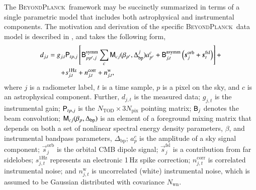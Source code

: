 \documentclass[twocolumn]{aa}
\newcommand{\s}[0]{\vec{s}}
\newcommand{\B}[0]{\tens{B}}
\newcommand{\M}[0]{\tens{M}}
\renewcommand{\P}[0]{\tens{P}}
\newcommand{\Dbp}[0]{\Delta_{\mathrm{bp}}}
\newcommand{\BP}{\textsc{BeyondPlanck}}
\begin{document}
The \BP\ framework may be succinctly summarized in terms of a single
parametric model that includes both astrophysical and instrumental
components. The motivation and derivation of the specific \BP\ data
model is described in \citet{bp01}, and takes the following form,
\begin{equation}
  \begin{split}
    d_{j,t} = g_{j,t}&\P_{tp,j}\left[\B^{\mathrm{symm}}_{pp',j}\sum_{c}
      \M_{cj}(\beta_{p'}, \Dbp^{j})a^c_{p'}  + \B^{\mathrm{asymm}}_{j,t}\left(\s^{\mathrm{orb}}_{j}  
      + \s^{\mathrm{fsl}}_{t}\right)\right] + \\
    + &s^{\mathrm{1Hz}}_{j,t} %
    + n^{\mathrm{corr}}_{j,t} + n^{\mathrm{w}}_{j,t},
  \end{split}
  \label{eq:model}
\end{equation}
where $j$ is a radiometer label, $t$ is a time sample, $p$ is a pixel
on the sky, and $c$ is an astrophysical component.  Further, $d_{j,t}$
is the measured data; $g_{j,t}$ is the instrumental gain; $\P_{tp,j}$
is the $N_{\mathrm{TOD}}\times 3N_{\mathrm{pix}}$ pointing matrix;
$\B_{j}$ denotes the beam convolution; $\M_{cj}(\beta_{p}, \Dbp)$ is
an element of a foreground mixing matrix that depends on both a set
of nonlinear spectral energy density parameters, $\beta$, and
instrumental bandpass parameters, $\Delta_{\mathrm{bp}}$; $a^c_{p}$ is
the amplitude of a sky signal component; $\s^{\mathrm{orb}}_{j}$ is
the orbital CMB dipole signal; $\s^{\mathrm{fsl}}_{j}$ is a contribution
from far sidelobes; $s^{\mathrm{1Hz}}_{j,t}$ represents an electronic
1\,Hz spike correction; $n^{\mathrm{corr}}_{j,t}$ is correlated
instrumental noise; and $n^{\mathrm{w}}_{j,t}$ is uncorrelated (white)
instrumental noise, which is assumed to be Gaussian distributed with
covariance $N_{\mathrm{wn}}$.
\end{document}
